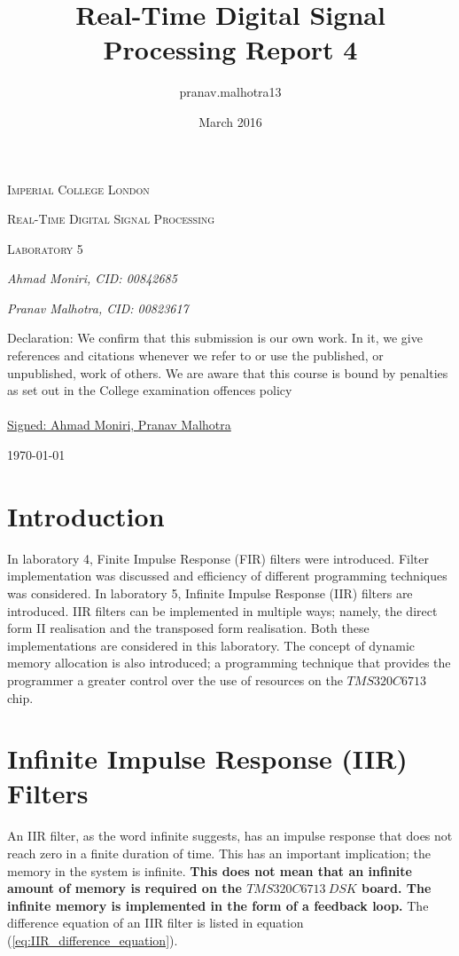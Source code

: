 \documentclass{article}
\title{Real-Time Digital Signal Processing Report 4}
\author{pranav.malhotra13 }
\date{March 2016}
\begin{document}
\begin{titlepage}
	\centering
	{\scshape\LARGE Imperial College London \par}
	\vspace{2cm}
	{\scshape\Large Real-Time Digital Signal Processing \par}
	\vspace{1cm}
	{\scshape\Large Laboratory 5\par}
	\vspace{2.5cm}
	{\Large\itshape Ahmad Moniri, CID: 00842685 \par}
	\vspace{1cm}
	{\Large\itshape Pranav Malhotra, CID: 00823617 \par}
	\vfill
	\begin{tcolorbox}
    \centering
    Declaration: We confirm that this submission is our own work. In it, we give references and citations whenever we refer to or use the published, or
    unpublished, work of others. We are aware that this course is bound by
    penalties as set out in the College examination offences policy \\~\\
    \underline{Signed: Ahmad Moniri, Pranav Malhotra}
    \end{tcolorbox}
	{\large \today\par}
\end{titlepage}

\newpage
\tableofcontents

\newpage
\section{Introduction}
In laboratory 4, Finite Impulse Response (FIR) filters were introduced. Filter implementation was discussed and efficiency of different programming techniques was considered. In laboratory 5, Infinite Impulse Response (IIR) filters are introduced. IIR filters can be implemented in multiple ways; namely, the direct form II realisation and the transposed form realisation. Both these implementations are considered in this laboratory. The concept of dynamic memory allocation is also introduced; a programming technique that provides the programmer a greater control over the use of resources on the $TMS320C6713$ chip.\\


\section{Infinite Impulse Response (IIR) Filters}\label{sec:IIR_filter}
An IIR filter, as the word infinite suggests, has an impulse response that does not reach zero in a finite duration of time. This has an important implication; the memory in the system is infinite. \textbf{This does not mean that an infinite amount of memory is required on the $TMS320C6713 \ DSK$ board. The infinite memory is implemented in the form of a feedback loop.} The difference equation of an IIR filter is listed in equation (\ref{eq:IIR_difference_equation}). 
\end{document}
